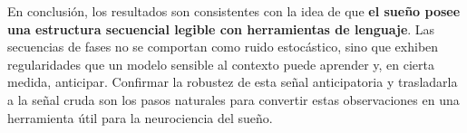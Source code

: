 En conclusión, los resultados son consistentes con la idea de que \textbf{el sueño posee una estructura secuencial legible con herramientas de lenguaje}. Las secuencias de fases no se comportan como ruido estocástico, sino que exhiben regularidades que un modelo sensible al contexto puede aprender y, en cierta medida, anticipar. Confirmar la robustez de esta señal anticipatoria y trasladarla a la señal cruda son los pasos naturales para convertir estas observaciones en una herramienta útil para la neurociencia del sueño.
